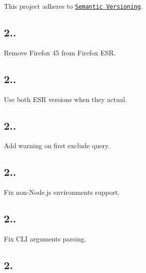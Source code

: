 This project adheres to \href{http://semver.org/}{\tt Semantic Versioning}.

\subsection*{2..}


\begin{DoxyItemize}
\item Remove Firefox 45 from Firefox E\+SR.
\end{DoxyItemize}

\subsection*{2..}


\begin{DoxyItemize}
\item Use both E\+SR versions when they actual.
\end{DoxyItemize}

\subsection*{2..}


\begin{DoxyItemize}
\item Add warning on first exclude query.
\end{DoxyItemize}

\subsection*{2..}


\begin{DoxyItemize}
\item Fix non-\/\+Node.\+js environments support.
\end{DoxyItemize}

\subsection*{2..}


\begin{DoxyItemize}
\item Fix C\+LI arguments parsing.
\end{DoxyItemize}

\subsection*{2.}


